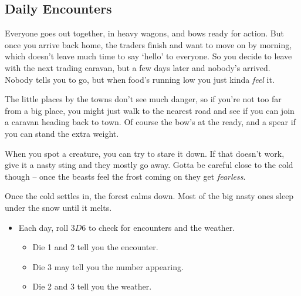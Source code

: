 \begin{multicols}{2}

\subsection{Daily Encounters}

\begin{exampletext}
  Everyone goes out together, in heavy wagons, and bows ready for action.
  But once you arrive back home, the traders finish and want to move on by morning, which doesn't leave much time to say `hello' to everyone.
  So you decide to leave with the next trading caravan, but a few days later and nobody's arrived.
  Nobody tells you to go, but when food's running low you just kinda \emph{feel} it.

  The little places by the towns don't see much danger, so if you're not too far from a big place, you might just walk to the nearest road and see if you can join a caravan heading back to town.
  Of course the bow's at the ready, and a spear if you can stand the extra weight.

  When you spot a creature, you can try to stare it down.
  If that doesn't work, give it a nasty sting and they mostly go away.
  Gotta be careful close to the cold though -- once the beasts feel the frost coming on they get \emph{fearless}.

  Once the cold settles in, the forest calms down.
  Most of the big nasty ones sleep under the snow until it melts.
\end{exampletext}


\begin{itemize}
  \item
  Each day, roll $3D6$ to check for encounters and the weather.
  \begin{itemize}
    \item
    Die 1 and 2 tell you the encounter.
    \item
    Die 3 may tell you the number appearing.
    \item
    Die 2 and 3 tell you the weather.
  \end{itemize}
\end{itemize}


\end{multicols}
